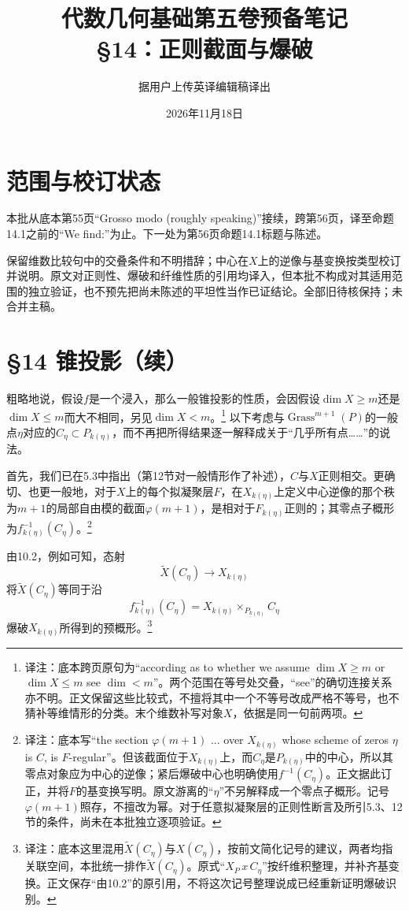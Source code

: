 \documentclass[openany,fontset=fandol]{ctexbook}
\newcommand{\note}[1]{\footnote{译注：#1}}
\begin{document}
\title{代数几何基础第五卷预备笔记\\§14：正则截面与爆破}
\author{据用户上传英译编辑稿译出}
\date{2026年11月18日}
\maketitle
\chapter*{范围与校订状态}
本批从底本第55页“Grosso modo (roughly speaking)”接续，跨第56页，译至命题14.1之前的“We find:”为止。下一处为第56页命题14.1标题与陈述。

保留维数比较句中的交叠条件和不明措辞；中心在$X$上的逆像与基变换按类型校订并说明。原文对正则性、爆破和纤维性质的引用均译入，但本批不构成对其适用范围的独立验证，也不预先把尚未陈述的平坦性当作已证结论。全部旧待核保持；未合并主稿。
\chapter*{§14 锥投影（续）}
粗略地说，假设$f$是一个浸入，那么一般锥投影的性质，会因假设$\dim X\geq m$还是$\dim X\leq m$而大不相同，另见$\dim X<m$。\note{底本跨页原句为“according as to whether we assume $\dim X\geq m$ or $\dim X\leq m$ see $\dim<m$”。两个范围在等号处交叠，“see”的确切连接关系亦不明。正文保留这些比较式，不擅将其中一个不等号改成严格不等号，也不猜补等维情形的分类。末个维数补写对象$X$，依据是同一句前两项。}
以下考虑与$\operatorname{Grass}^{m+1}(P)$的一般点$\eta$对应的$C_\eta\subset P_{k(\eta)}$，而不再把所得结果逐一解释成关于“几乎所有点……”的说法。

首先，我们已在5.3中指出（第12节对一般情形作了补述），$C$与$X$正则相交。更确切、也更一般地，对于$X$上的每个拟凝聚层$F$，在$X_{k(\eta)}$上定义中心逆像的那个秩为$m+1$的局部自由模的截面$\varphi(m+1)$，是相对于$F_{k(\eta)}$正则的；其零点子概形为$f_{k(\eta)}^{-1}(C_\eta)$。\note{底本写“the section $\varphi(m+1)$ ... over $X_{k(\eta)}$ whose scheme of zeros $\eta$ is $C$, is $F$-regular”。但该截面位于$X_{k(\eta)}$上，而$C_\eta$是$P_{k(\eta)}$中的中心，所以其零点对象应为中心的逆像；紧后爆破中心也明确使用$f^{-1}(C_\eta)$。正文据此订正，并将$F$的基变换写明。原文游离的“$\eta$”不另解释成一个零点子概形。记号$\varphi(m+1)$照存，不擅改为幂。对于任意拟凝聚层的正则性断言及所引5.3、12节的条件，尚未在本批独立逐项验证。}

由10.2，例如可知，态射
\[
\widetilde X(C_\eta)\longrightarrow X_{k(\eta)}
\]
将$\widetilde X(C_\eta)$等同于沿
\[
f_{k(\eta)}^{-1}(C_\eta)
=X_{k(\eta)}\times_{P_{k(\eta)}}C_\eta
\]
爆破$X_{k(\eta)}$所得到的预概形。\note{底本这里混用$\widetilde X(C_\eta)$与$X(C_\eta)$，按前文简化记号的建议，两者均指关联空间，本批统一排作$\widetilde X(C_\eta)$。原式“$X_P\,x\,C_\eta$”按纤维积整理，并补齐基变换。正文保存“由10.2”的原引用，不将这次记号整理说成已经重新证明爆破识别。}
\end{document}
